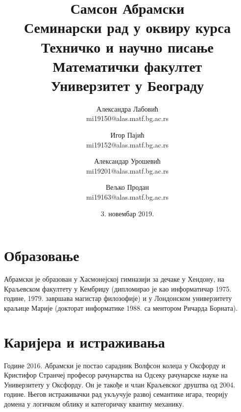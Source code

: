 \documentclass[a4paper]{article}
\begin{document}



\title{Самсон Абрамски\\ \small{Семинарски рад у оквиру курса\\Техничко и научно писање\\ Математички факултет \\ Универзитет у Београду}}

\date{3. новембар 2019.}

\author{Александра Лабовић \\ mi19150@alas.matf.bg.ac.rs \and
	Игор Пајић \\ mi19152@alas.matf.bg.ac.rs \and
	Александар Урошевић \\ mi19201@alas.matf.bg.ac.rs \and
	Вељко Продан \\ mi19163@alas.matf.bg.ac.rs }

\begin{center}
\maketitle
\end{center}


\tableofcontents

\newpage

\section{Образовање}
\label{sec:uvod}
Абрамски је образован у Хасмонејској гимназији за дечаке у Хендону, на Краљевском факултету у Кембриџу (дипломирао је као информатичар 1975. године, 1979. завршава магистар филозофије) и у Лондонском универзитету краљице Марије (докторат информатике 1988. са ментором Ричарда Борната).\cite{obr}

\section{Каријера и истраживања}
Године 2016. Абрамски је постао сарадник Волфсон колеџа у Оксфорду и Кристифор Странчеј професор рачунарства на Одсеку рачунарске науке на Универзитету у Оксфорду. Он је такође и члан Краљевског друштва од 2004. године. Његов истраживачки рад укључује развој семантике игара, теорију домена у логичком облику и категоричку квантну механику.
\end{document}
